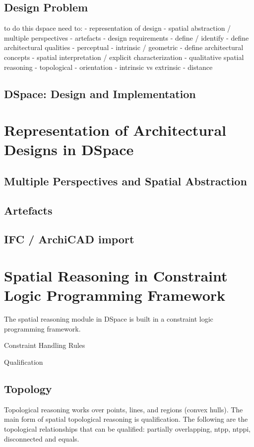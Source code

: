 \documentclass[12pt]{ucthesis}
\begin{document}
\section{Design Problem}

to do this dspace need to:
 - representation of design
 	- spatial abstraction / multiple perspectives
 	- artefacts
 - design requirements - define / identify
 	- define architectural qualities
 		- perceptual
 		- intrinsic / geometric
 	- define architectural concepts
	- spatial interpretation / explicit characterization
 - qualitative spatial reasoning
 	- topological 
 	- orientation
 		- intrinsic vs extrinsic
 	- distance


\section{DSpace: Design and Implementation}


\chapter{Representation of Architectural Designs in DSpace}
\section{Multiple Perspectives and Spatial Abstraction}
\section{Artefacts}
\section{IFC / ArchiCAD import}

\chapter{Spatial Reasoning in Constraint Logic Programming Framework}
The spatial reasoning module in DSpace is built in a constraint logic programming framework. 

Constraint Handling Rules

Qualification

\section{Topology}
Topological reasoning works over points, lines, and regions (convex hulls). The main form of spatial topological reasoning is qualification. The following are the topological relationships that can be qualified: partially overlapping, ntpp, ntppi, disconnected and equals. 
\end{document}
